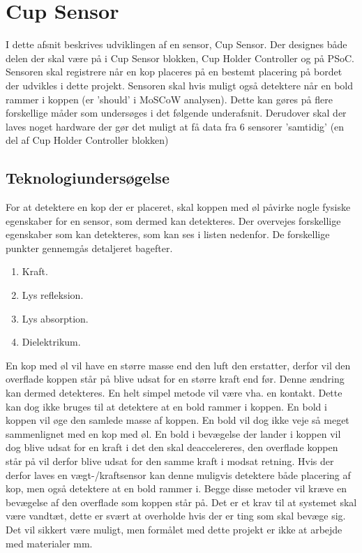 \documentclass[HardwareDesign/HardwareDesign_main.tex]{subfiles}
\begin{document}
\section{Cup Sensor} \label{sec:CupSensor}
I dette afsnit beskrives udviklingen af en sensor, Cup Sensor. Der designes både delen der skal være på i Cup Sensor blokken, Cup Holder Controller og på PSoC. Sensoren skal registrere når en kop placeres på en bestemt placering på bordet der udvikles i dette projekt. Sensoren skal hvis muligt også detektere når en bold rammer i koppen (er 
'should' i MoSCoW analysen). Dette kan gøres på flere forskellige måder som undersøges i det følgende underafsnit. Derudover skal der laves noget hardware der gør det muligt at få data fra 6 sensorer 'samtidig' (en del af Cup Holder Controller blokken)

\subsection{Teknologiundersøgelse} \label{sec:CupSensorTekUnder}
For at detektere en kop der er placeret, skal koppen med øl påvirke nogle fysiske egenskaber for en sensor, som dermed kan detekteres. Der overvejes forskellige egenskaber som kan detekteres, som kan ses i listen nedenfor. De forskellige punkter gennemgås detaljeret bagefter.
\begin{enumerate}
    \item \label{itm:cupSensor_weight} Kraft.
    \item \label{itm:cupSensor_lightReflection} Lys refleksion. 
    \item \label{itm:cupSensor_lightAbsorbtion} Lys absorption.
    \item \label{itm:cupSensor_capacitive} Dielektrikum.
\end{enumerate}

En kop med øl vil have en større masse end den luft den erstatter, derfor vil den overflade koppen står på blive udsat for en større kraft end før. Denne ændring kan dermed detekteres. En helt simpel metode vil være vha. en kontakt. Dette kan dog ikke bruges til at detektere at en bold rammer i koppen. En bold i koppen vil øge den samlede masse af koppen. En bold vil dog ikke veje så meget sammenlignet med en kop med øl. En bold i bevægelse der lander i koppen vil dog blive udsat for en kraft i det den skal deaccelereres, den overflade koppen står på vil derfor blive udsat for den samme kraft i modsat retning. Hvis der derfor laves en vægt-/kraftsensor kan denne muligvis detektere både placering af kop, men også detektere at en bold rammer i. Begge disse metoder vil kræve en bevægelse af den overflade som koppen står på. Det er et krav til at systemet skal være vandtæt,  dette er svært at overholde hvis der er ting som skal bevæge sig. Det vil sikkert være muligt, men formålet med dette projekt er ikke at arbejde med materialer mm.
\end{document}
